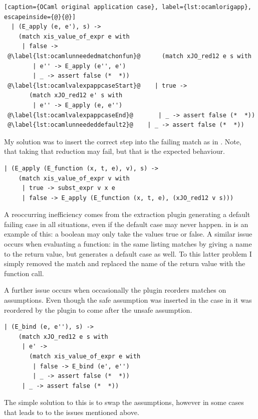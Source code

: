 \documentclass[12pt,twoside,notitlepage]{report}
\begin{document}
\begin{minipage}{\linewidth}
\begin{lstlisting}[caption={OCaml original application case}, label={lst:ocamlorigapp}, escapeinside={@}{@}]
  | (E_apply (e, e'), s) ->
    (match xis_value_of_expr e with
     | false ->
 @\label{lst:ocamlunneededmatchonfun}@      (match xJO_red12 e s with
        | e'' -> E_apply (e'', e')
        | _ -> assert false (*  *))
 @\label{lst:ocamlvalexpappcaseStart}@    | true ->
       (match xJO_red12 e' s with
        | e'' -> E_apply (e, e'')
 @\label{lst:ocamlvalexpappcaseEnd}@       | _ -> assert false (*  *))
 @\label{lst:ocamlunneededdefault2}@    | _ -> assert false (*  *))
\end{lstlisting}
\end{minipage}
My solution was to insert the correct step into the failing match as in . Note, that taking that reduction may fail, but that is the expected behaviour.
\begin{minipage}{\linewidth}
\begin{lstlisting}[caption={OCaml fixed substitution case}, label={lst:ocamlfixsub}]
  | (E_apply (E_function (x, t, e), v), s) ->
    (match xis_value_of_expr v with
     | true -> subst_expr v x e
     | false -> E_apply (E_function (x, t, e), (xJO_red12 v s)))
\end{lstlisting}
\end{minipage}
A reoccurring inefficiency comes from the extraction plugin generating a default failing case in all situations, even if the default case may never happen.  in  is an example of this: a boolean may only take the values true or false. A similar issue occurs when evaluating a function:   in the same listing matches by giving a name to the return value, but generates a default case as well. To this latter problem I simply removed the match and replaced the name of the return value with the function call.

A further issue occurs when occasionally the plugin reorders matches on assumptions. Even though the safe assumption was inserted in the case in  it was reordered by the plugin to come after the unsafe assumption. 
\begin{minipage}{\linewidth}
\begin{lstlisting}[caption={OCaml swapped assumptions}, label={lst:ocamlswapassume}]
  | (E_bind (e, e''), s) ->
    (match xJO_red12 e s with
     | e' ->
       (match xis_value_of_expr e with
        | false -> E_bind (e', e'')
        | _ -> assert false (*  *))
     | _ -> assert false (*  *))
\end{lstlisting}
\end{minipage}
The simple solution to this is to swap the assumptions, however in some cases that leads to to the issues mentioned above.
\end{document}
